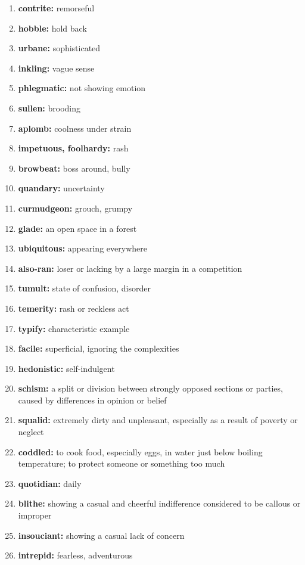 \documentclass{article}
\begin{document}
\begin{enumerate}
    \item \textbf{contrite: }{remorseful}
    \item \textbf{hobble: }{hold back}
    \item \textbf{urbane: }{sophisticated}
    \item \textbf{inkling: }{vague sense}
    \item \textbf{phlegmatic: }{not showing emotion}
    \item \textbf{sullen: }{brooding}
    \item \textbf{aplomb: }{coolness under strain}
    \item \textbf{impetuous, foolhardy: }{rash}
    \item \textbf{browbeat: }{boss around, bully}
    \item \textbf{quandary: }{uncertainty}
    \item \textbf{curmudgeon: }{grouch, grumpy}
    \item \textbf{glade: }{an open space in a forest}
    \item \textbf{ubiquitous: }{appearing everywhere}
    \item \textbf{also-ran: }{loser or lacking by a large margin in a competition}
    \item \textbf{tumult: }{state of confusion, disorder}
    \item \textbf{temerity: }{rash or reckless act}
    \item \textbf{typify: }{characteristic example}
    \item \textbf{facile: }{superficial, ignoring the complexities}
    \item \textbf{hedonistic: }{self-indulgent}
    \item \textbf{schism: }{a split or division between strongly opposed sections or parties, caused by differences in opinion or belief}
    \item \textbf{squalid: }{extremely dirty and unpleasant, especially as a result of poverty or neglect}
    \item \textbf{coddled: }{to cook food, especially eggs, in water just below boiling temperature; to protect someone or something too much}
    \item \textbf{quotidian: }{daily}
    \item \textbf{blithe: }{showing a casual and cheerful indifference considered to be callous or improper}
    \item \textbf{insouciant: }{showing a casual lack of concern}
    \item \textbf{intrepid: }{fearless, adventurous}

\end{enumerate}
\end{document}

